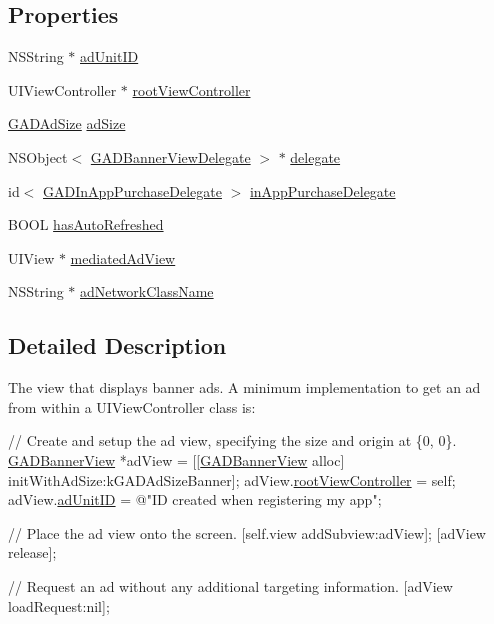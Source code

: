 \subsection*{Properties}
\begin{DoxyCompactItemize}
\item 
N\+S\+String $\ast$ \hyperlink{interfaceGADBannerView_aef7fb22ba623052ded92a496718b4a37}{ad\+Unit\+ID}
\item 
U\+I\+View\+Controller $\ast$ \hyperlink{interfaceGADBannerView_a6ee3d304435bd03ab011c4e08359563c}{root\+View\+Controller}
\item 
\hyperlink{structGADAdSize}{G\+A\+D\+Ad\+Size} \hyperlink{interfaceGADBannerView_afb0c778e6fa6584f63b7c1d06a4f96fa}{ad\+Size}
\item 
N\+S\+Object$<$ \hyperlink{protocolGADBannerViewDelegate-p}{G\+A\+D\+Banner\+View\+Delegate} $>$ $\ast$ \hyperlink{interfaceGADBannerView_a7e52a5109dc6d9936303c73a74ce4e5a}{delegate}
\item 
id$<$ \hyperlink{protocolGADInAppPurchaseDelegate-p}{G\+A\+D\+In\+App\+Purchase\+Delegate} $>$ \hyperlink{interfaceGADBannerView_a3570b23f24955977ad690b01bdb3279b}{in\+App\+Purchase\+Delegate}
\item 
B\+O\+OL \hyperlink{interfaceGADBannerView_a3f3b070d051daa56c1d60709ee5eeaab}{has\+Auto\+Refreshed}
\item 
U\+I\+View $\ast$ \hyperlink{interfaceGADBannerView_a239f588da48d1fe9e12eeff079ab6700}{mediated\+Ad\+View}
\item 
N\+S\+String $\ast$ \hyperlink{interfaceGADBannerView_ac3832b1fd7640885f26c780cd1f8c977}{ad\+Network\+Class\+Name}
\end{DoxyCompactItemize}


\subsection{Detailed Description}
The view that displays banner ads. A minimum implementation to get an ad from within a U\+I\+View\+Controller class is\+:


\begin{DoxyCode}
\textcolor{comment}{// Create and setup the ad view, specifying the size and origin at \{0, 0\}.}
\hyperlink{interfaceGADBannerView}{GADBannerView} *adView = [[\hyperlink{interfaceGADBannerView}{GADBannerView} alloc] initWithAdSize:kGADAdSizeBanner];
adView.\hyperlink{interfaceGADBannerView_a6ee3d304435bd03ab011c4e08359563c}{rootViewController} = \textcolor{keyword}{self};
adView.\hyperlink{interfaceGADBannerView_aef7fb22ba623052ded92a496718b4a37}{adUnitID} = \textcolor{stringliteral}{@"ID created when registering my app"};

\textcolor{comment}{// Place the ad view onto the screen.}
[\textcolor{keyword}{self}.view addSubview:adView];
[adView release];

\textcolor{comment}{// Request an ad without any additional targeting information.}
[adView loadRequest:nil];
\end{DoxyCode}
 


